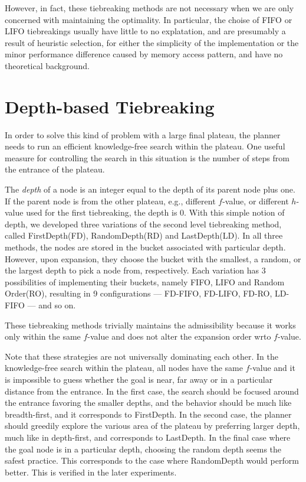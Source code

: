 However, in fact, these tiebreaking methods are not necessary when we
are only concerned with maintaining the optimality. In particular, the
choise of FIFO or LIFO tiebreakings usually have little to no
explatation, and are presumably a result of heuristic selection, for
either the simplicity of the implementation or the minor performance difference
caused by memory access pattern, and have no theoretical background.








\section{Depth-based Tiebreaking}

In order to solve this kind of problem with a large final plateau, the
planner needs to run an efficient knowledge-free search within the
plateau.  One useful measure for controlling the search in this
situation is the number of steps from the entrance of the plateau.

The \emph{depth} of a node is an integer equal to the depth of its
parent node plus one. If the parent node is from the other plateau,
e.g., different $f$-value, or different $h$-value used for the first
tiebreaking, the depth is 0.  With this simple notion of depth, we
developed three variations of the second level tiebreaking method,
called FirstDepth(FD), RandomDepth(RD) and LastDepth(LD). In all three
methods, the nodes are stored in the bucket associated with particular
depth.  However, upon expansion, they choose the bucket with the smallest,
a random, or the largest depth to pick a node from, respectively.
Each variation has 3 possibilities of implementing their buckets, namely
FIFO, LIFO and Random Order(RO), resulting in 9 configurations ---
FD-FIFO, FD-LIFO, FD-RO, LD-FIFO --- and so on.

These tiebreaking methods trivially maintains the admissibility because
it works only within the same $f$-value and does not alter the expansion
order wrto $f$-value.

Note that these strategies are not universally dominating each other.
In the knowledge-free search within the plateau, all nodes have the same
$f$-value and it is impossible to guess whether the goal is near, far
away or in a particular distance from the entrance. In the first case,
the search should be focused around the entrance favoring the smaller
depths, and the behavior should be much like breadth-first, and it
corresponds to FirstDepth. In the second case, the planner should
greedily explore the various area of the plateau by preferring larger
depth, much like in depth-first, and corresponds to LastDepth. In the
final case where the goal node is in a particular depth, choosing the
random depth seems the safest practice. This corresponds to the case
where RandomDepth would perform better.
% 
This is verified in the later experiments.

